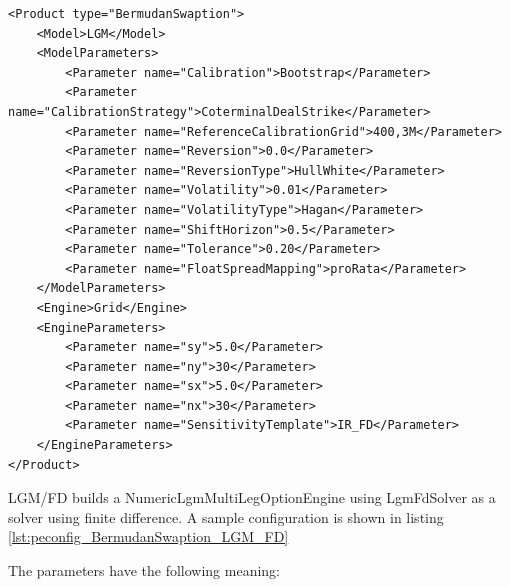 \begin{longlisting}
\begin{verbatim}
<Product type="BermudanSwaption">
    <Model>LGM</Model>
    <ModelParameters>
        <Parameter name="Calibration">Bootstrap</Parameter>
        <Parameter name="CalibrationStrategy">CoterminalDealStrike</Parameter>
        <Parameter name="ReferenceCalibrationGrid">400,3M</Parameter>
        <Parameter name="Reversion">0.0</Parameter>
        <Parameter name="ReversionType">HullWhite</Parameter>
        <Parameter name="Volatility">0.01</Parameter>
        <Parameter name="VolatilityType">Hagan</Parameter>
        <Parameter name="ShiftHorizon">0.5</Parameter>
        <Parameter name="Tolerance">0.20</Parameter>
        <Parameter name="FloatSpreadMapping">proRata</Parameter>
    </ModelParameters>
    <Engine>Grid</Engine>
    <EngineParameters>
        <Parameter name="sy">5.0</Parameter>
        <Parameter name="ny">30</Parameter>
        <Parameter name="sx">5.0</Parameter>
        <Parameter name="nx">30</Parameter>
        <Parameter name="SensitivityTemplate">IR_FD</Parameter>
    </EngineParameters>
</Product>
\end{verbatim}
\caption{Configuration for Product BermudanSwaption, Model LGM, Engine Grid}
\label{lst:peconfig_BermudanSwaption_LGM_Grid}
\end{longlisting}

LGM/FD builds a NumericLgmMultiLegOptionEngine using LgmFdSolver as a solver using finite difference. A sample
configuration is shown in listing \ref{lst:peconfig_BermudanSwaption_LGM_FD}

The parameters have the following meaning:

